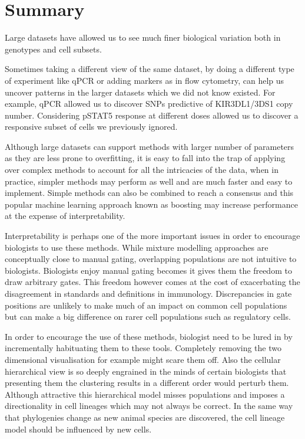 \section{Summary}

Large datasets have allowed us to see much finer biological variation both in genotypes and cell subsets.

Sometimes taking a different view of the same dataset, by doing a different type of experiment like qPCR or adding markers as in flow cytometry,
can help us uncover patterns in the larger datasets which we did not know existed.
For example, qPCR allowed us to discover SNPs predictive of KIR3DL1/3DS1 copy number.
Considering pSTAT5 response at different doses allowed us to discover a responsive subset of cells we previously ignored.

Although large datasets can support methods with larger number of parameters as they are less prone to overfitting,
it is easy to fall into the trap of applying over complex methods to account for all the intricacies of the data,
when in practice, simpler methods may perform as well and are much faster and easy to implement.
Simple methods can also be combined to reach a consensus and this popular machine learning approach known as boosting
may increase performance at the expense of interpretability.

Interpretability is perhaps one of the more important issues in order to encourage biologists to use these methods.
While mixture modelling approaches are conceptually close to manual gating, overlapping populations are not intuitive to biologists.
Biologists enjoy manual gating becomes it gives them the freedom to draw arbitrary gates.
This freedom however comes at the cost of exacerbating the disagreement in standards and definitions in immunology.
Discrepancies in gate positions are unlikely to make much of an impact on common cell populations but can make a big difference on rarer cell populations
such as regulatory cells.

In order to encourage the use of these methods, biologist need to be lured in by incrementally habituating them to these tools.
Completely removing the two dimensional visualisation for example might scare them off.
Also the cellular hierarchical view is so deeply engrained in the minds of certain biologists that presenting them the clustering results
in a different order would perturb them.  Although attractive this hierarchical model misses populations and imposes a directionality
in cell lineages which may not always be correct.  In the same way that phylogenies change as new animal species are discovered,
the cell lineage model should be influenced by new cells.

